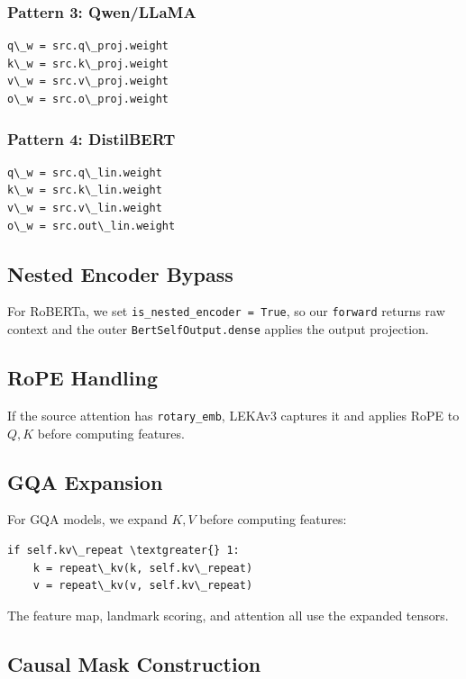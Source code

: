 \subsubsection{Pattern 3: Qwen/LLaMA}

\begin{lstlisting}
q\_w = src.q\_proj.weight
k\_w = src.k\_proj.weight
v\_w = src.v\_proj.weight
o\_w = src.o\_proj.weight
\end{lstlisting}

\subsubsection{Pattern 4: DistilBERT}

\begin{lstlisting}
q\_w = src.q\_lin.weight
k\_w = src.k\_lin.weight
v\_w = src.v\_lin.weight
o\_w = src.out\_lin.weight
\end{lstlisting}

\subsection{Nested Encoder Bypass}

For RoBERTa, we set \texttt{is\_nested\_encoder = True}, so our \texttt{forward} returns raw 
context and the outer \texttt{BertSelfOutput.dense} applies the output projection.

\subsection{RoPE Handling}

If the source attention has \texttt{rotary\_emb}, LEKAv3 captures it and applies 
RoPE to $Q, K$ before computing features.

\subsection{GQA Expansion}

For GQA models, we expand $K, V$ before computing features:

\begin{lstlisting}
if self.kv\_repeat \textgreater{} 1:
    k = repeat\_kv(k, self.kv\_repeat)
    v = repeat\_kv(v, self.kv\_repeat)
\end{lstlisting}

The feature map, landmark scoring, and attention all use the expanded tensors.

\subsection{Causal Mask Construction}

